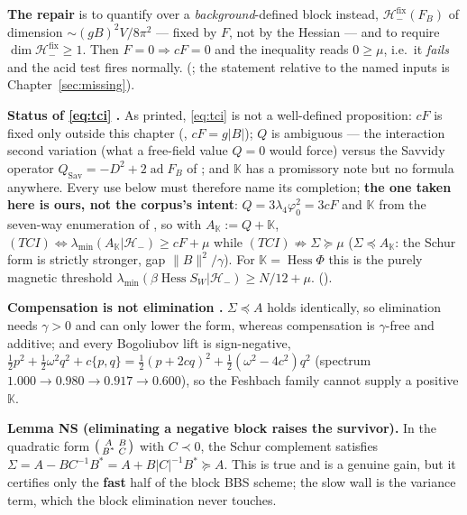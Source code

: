 \textbf{The repair} is to quantify over a \emph{background}-defined block instead,
$\mathcal{H}_-^{\mathrm{fix}}(F_B)$ of dimension $\sim(gB)^2V/8\pi^2$ --- fixed by $F$, not by the
Hessian --- and to require $\dim\mathcal{H}_-^{\mathrm{fix}}\ge1$. Then $F=0\Rightarrow cF=0$ and the
inequality reads $0\ge\mu$, i.e.\ it \emph{fails} and the acid test fires normally. \LT{}
(; the statement relative to the named inputs is
Chapter~\ref{sec:missing}).

\textbf{Status of \eqref{eq:tci} \LN.} As printed, \eqref{eq:tci} is not a well-defined proposition:
$cF$ is fixed only outside this chapter (, $cF=g|B|$); $Q$ is ambiguous
--- the interaction second variation (what a free-field value $Q=0$ would force) versus the Savvidy
operator $Q_{\mathrm{Sav}}=-D^2+2\operatorname{ad}F_B$ of ; and $\mathbb{K}$
has a promissory note but no formula anywhere. Every use below must therefore name its completion;
\textbf{the one taken here is ours, not the corpus's intent}: $Q=3\lambda_4\varphi_0^2=3cF$ and
$\mathbb{K}$ from the seven-way enumeration of , so with
$A_{\mathbb{K}}:=Q+\mathbb{K}$, $(TCI)\iff\lambda_{\min}(A_{\mathbb{K}}|\mathcal{H}_-)\ge cF+\mu$ while
$(TCI)\not\Rightarrow\Sigma\succeq\mu$ ($\Sigma\preceq A_{\mathbb{K}}$: the Schur form is strictly
stronger, gap $\|B\|^2/\gamma$). For $\mathbb{K}=\operatorname{Hess}\Phi$ this is the purely magnetic
threshold $\lambda_{\min}(\beta\operatorname{Hess}S_W|\mathcal{H}_-)\ge N/12+\mu$. \LC{}
().

\textbf{Compensation is not elimination \LT.} $\Sigma\preceq A$ holds identically, so elimination
needs $\gamma>0$ and can only lower the form, whereas compensation is $\gamma$-free and additive; and
every Bogoliubov lift is sign-negative,
$\tfrac12p^2+\tfrac12\omega^2q^2+c\{p,q\}=\tfrac12(p+2cq)^2+\tfrac12(\omega^2-4c^2)q^2$ (spectrum
$1.000\to0.980\to0.917\to0.600$), so the Feshbach family cannot supply a positive $\mathbb{K}$.

\textbf{Lemma NS (eliminating a negative block raises the survivor).} In the quadratic form
$\begin{psmallmatrix}A&B\\B^*&C\end{psmallmatrix}$ with $C\prec0$, the Schur complement satisfies
$\Sigma=A-BC^{-1}B^*=A+B|C|^{-1}B^*\succeq A$. This is true and is a genuine gain, but it
certifies only the \textbf{fast} half of the block BBS scheme; the slow wall is the variance term,
which the block elimination never touches.


